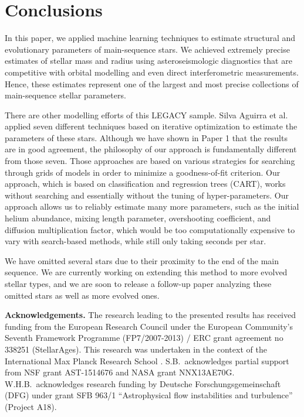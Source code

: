 \documentclass[epj,twocolumn]{webofc}
\begin{document}
\section{Conclusions}
\label{conclusions}

In this paper, we applied machine learning techniques to estimate structural and evolutionary parameters of main-sequence stars. We achieved extremely precise estimates of stellar mass and radius using asteroseismologic diagnostics that are competitive with orbital modelling and even direct interferometric measurements. Hence, these estimates represent one of the largest and most precise collections of main-sequence stellar parameters. 

There are other modelling efforts of this LEGACY sample. Silva Aguirra et al.~\cite{SA} applied seven different techniques based on iterative optimization to estimate the parameters of these stars. 
Although we have shown in Paper 1 that the results are in good agreement, the philosophy of our approach is fundamentally different from those seven. 
Those approaches are based on various strategies for searching through grids of models in order to minimize a goodness-of-fit criterion. 
Our approach, which is based on classification and regression trees (CART), works without searching and essentially without the tuning of hyper-parameters. 
Our approach allows us to reliably estimate many more parameters, such as the initial helium abundance, mixing length parameter, overshooting coefficient, and diffusion multiplication factor, which would be too computationally expensive to vary with search-based methods, while still only taking seconds per star. 

We have omitted several stars due to their proximity to the end of the main sequence. We are currently working on extending this method to more evolved stellar types, and we are soon to release a follow-up paper analyzing these omitted stars as well as more evolved ones. 
%
%
%
%
%
%

\textbf{Acknowledgements.} The research leading to the presented results has received funding from the European Research Council under the European Community's Seventh Framework Programme (FP7/2007-2013) / ERC grant agreement no 338251 (StellarAges). This research was undertaken in the context of the International Max Planck Research School . S.B.\ acknowledges partial support from NSF grant AST-1514676 and NASA grant NNX13AE70G. W.H.B.\ acknowledges research funding by Deutsche Forschungsgemeinschaft (DFG) under grant SFB 963/1 ``Astrophysical flow instabilities and turbulence'' (Project A18).
\end{document}
